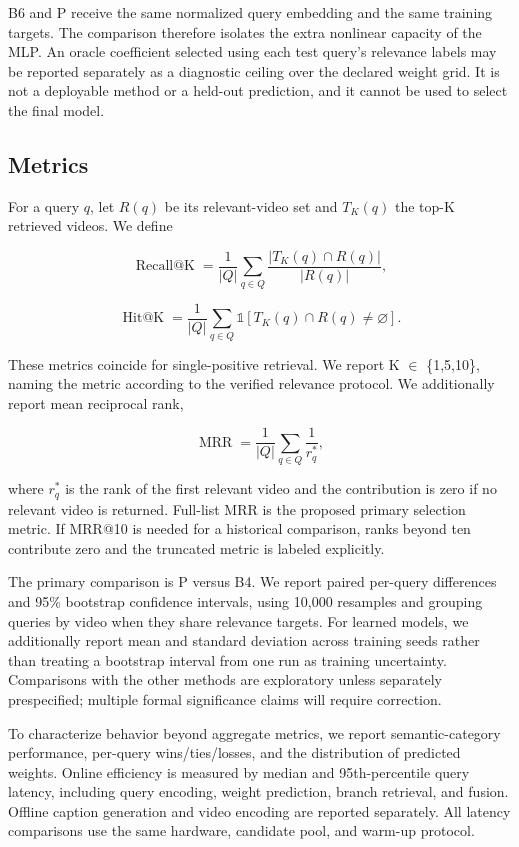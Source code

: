 B6 and P receive the same normalized query embedding and the same training targets. The comparison therefore isolates the extra nonlinear capacity of the MLP. An oracle coefficient selected using each test query's relevance labels may be reported separately as a diagnostic ceiling over the declared weight grid. It is not a deployable method or a held-out prediction, and it cannot be used to select the final model.

\subsection{Metrics}

For a query \(q\), let \(R(q)\) be its relevant-video set and \(T_K(q)\) the top-K retrieved videos. We define

\[
\operatorname{Recall@K}=\frac{1}{|Q|}\sum_{q\in Q}
\frac{|T_K(q)\cap R(q)|}{|R(q)|},
\]

\[
\operatorname{Hit@K}=\frac{1}{|Q|}\sum_{q\in Q}
\mathbb{1}[T_K(q)\cap R(q)\ne\varnothing].
\]

These metrics coincide for single-positive retrieval. We report K \(\in\) \{1,5,10\}, naming the metric according to the verified relevance protocol. We additionally report mean reciprocal rank,

\[
\operatorname{MRR}=\frac{1}{|Q|}\sum_{q\in Q}\frac{1}{r_q^*},
\]

where \(r_q^*\) is the rank of the first relevant video and the contribution is zero if no relevant video is returned. Full-list MRR is the proposed primary selection metric. If MRR@10 is needed for a historical comparison, ranks beyond ten contribute zero and the truncated metric is labeled explicitly.

The primary comparison is P versus B4. We report paired per-query differences and 95\% bootstrap confidence intervals, using 10,000 resamples and grouping queries by video when they share relevance targets. For learned models, we additionally report mean and standard deviation across training seeds rather than treating a bootstrap interval from one run as training uncertainty. Comparisons with the other methods are exploratory unless separately prespecified; multiple formal significance claims will require correction.

To characterize behavior beyond aggregate metrics, we report semantic-category performance, per-query wins/ties/losses, and the distribution of predicted weights. Online efficiency is measured by median and 95th-percentile query latency, including query encoding, weight prediction, branch retrieval, and fusion. Offline caption generation and video encoding are reported separately. All latency comparisons use the same hardware, candidate pool, and warm-up protocol.

